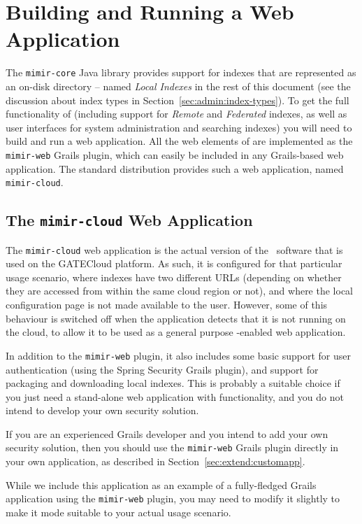 \section{Building and Running a \Mimir{} Web
Application}\label{sec:building}

The {\tt mimir-core} Java library provides support for indexes that are
represented as an on-disk directory -- named {\em Local Indexes} in the rest of
this document (see the discussion about index types in
Section~\ref{sec:admin:index-types}). To get the full functionality of \Mimir{}
(including support for {\em Remote} and {\em Federated} indexes, as well as user
interfaces for system administration and searching indexes) you will need to
build and run a web application. All the web elements of \Mimir{} are
implemented as the {\tt mimir-web} Grails plugin, which can easily be included
in any Grails-based web application. The standard \Mimir{} distribution provides
such a web application, named {\tt mimir-cloud}.

\subsection{The {\tt mimir-cloud} Web Application}
\label{sec:mimir-cloud}
The {\tt mimir-cloud} web application is the actual version of the \Mimir\
software that is used on the GATECloud platform. As such, it is configured for
that particular usage scenario, where indexes have two different URLs (depending
on whether they are accessed from within the same cloud region or not), and
where the local configuration page is not made available to the user. However,
some of this behaviour is switched off when the application detects that it is
not running on the cloud, to allow it to be used as a general purpose
\Mimir{}-enabled web application.

In addition to the {\tt mimir-web} plugin, it also includes some basic support
for user authentication (using the Spring Security Grails plugin), and support
for packaging and downloading local indexes. This is probably a suitable choice
if you just need a stand-alone web application with \Mimir{} functionality, and
you do not intend to develop your own security solution.

If you are an experienced Grails developer and you intend to add your own
security solution, then you should use the {\tt mimir-web} Grails plugin
directly in your own application, as described in
Section~\ref{sec:extend:customapp}.

While we include this application as an example of a fully-fledged Grails
application using the {\tt mimir-web} plugin, you may need to modify it slightly
to make it mode suitable to your actual usage scenario.

